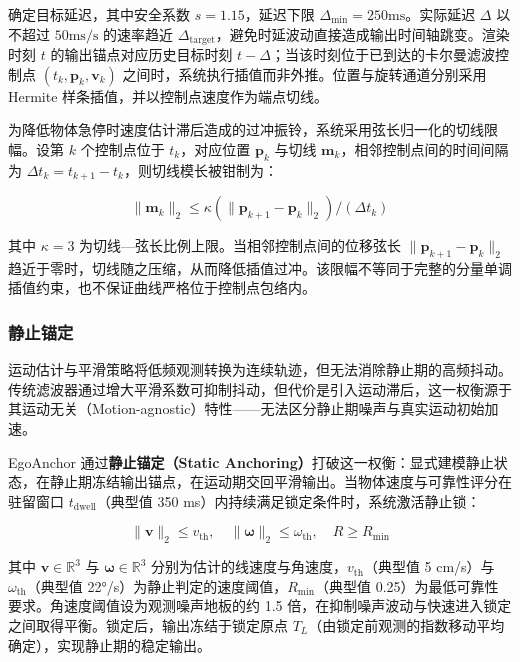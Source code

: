\documentclass[review]{vgtc}
\begin{document}
确定目标延迟，其中安全系数 $s = 1.15$，延迟下限 $\Delta_{\mathrm{min}} = 250 \mathrm{ms}$。实际延迟 $\Delta$ 以不超过 $50 \mathrm{ms}/\mathrm{s}$ 的速率趋近 $\Delta_{\mathrm{target}}$，避免时延波动直接造成输出时间轴跳变。渲染时刻 $t$ 的输出锚点对应历史目标时刻 $t - \Delta$；当该时刻位于已到达的卡尔曼滤波控制点 ${(t_k, \mathbf{p}_k, \mathbf{v}_k)}$ 之间时，系统执行插值而非外推。位置与旋转通道分别采用 Hermite 样条插值，并以控制点速度作为端点切线。

为降低物体急停时速度估计滞后造成的过冲振铃，系统采用弦长归一化的切线限幅。设第 $k$ 个控制点位于 $t_k$，对应位置 $\mathbf{p}_k$ 与切线 $\mathbf{m}_k$，相邻控制点间的时间间隔为 $\Delta t_k = t_{k+1} - t_k$，则切线模长被钳制为：

\begin{equation}
\lVert \mathbf{m}_k \rVert_2 \leq \kappa (\lVert \mathbf{p}_{k+1} - \mathbf{p}_k \rVert_2) / (\Delta t_k)
\label{eq:tangent-clamp}
\end{equation}


其中 $\kappa = 3$ 为切线---弦长比例上限。当相邻控制点间的位移弦长 $\lVert \mathbf{p}_{k+1} - \mathbf{p}_k \rVert_2$ 趋近于零时，切线随之压缩，从而降低插值过冲。该限幅不等同于完整的分量单调插值约束，也不保证曲线严格位于控制点包络内。

\subsubsection{静止锚定}\label{sec:staticlock}


运动估计与平滑策略将低频观测转换为连续轨迹，但无法消除静止期的高频抖动。传统滤波器通过增大平滑系数可抑制抖动，但代价是引入运动滞后，这一权衡源于其运动无关（Motion-agnostic）特性------无法区分静止期噪声与真实运动初始加速。

EgoAnchor 通过\textbf{静止锚定（Static Anchoring）}打破这一权衡：显式建模静止状态，在静止期冻结输出锚点，在运动期交回平滑输出。当物体速度与可靠性评分在驻留窗口 $t_{\mathrm{dwell}}$（典型值 350 ms）内持续满足锁定条件时，系统激活静止锁：

\begin{equation}
\lVert \mathbf{v} \rVert_2 \leq v_{\mathrm{th}}, \quad \lVert \mathbf{\omega} \rVert_2 \leq \omega_{\mathrm{th}}, \quad R \geq R_{\mathrm{min}}
\label{eq:lock-condition}
\end{equation}


其中 $\mathbf{v} \in \mathbb{R}^3$ 与 $\mathbf{\omega} \in \mathbb{R}^3$ 分别为估计的线速度与角速度，$v_{\mathrm{th}}$（典型值 5 cm/s）与 $\omega_{\mathrm{th}}$（典型值 22°/s）为静止判定的速度阈值，$R_{\mathrm{min}}$（典型值 0.25）为最低可靠性要求。角速度阈值设为观测噪声地板的约 1.5 倍，在抑制噪声波动与快速进入锁定之间取得平衡。锁定后，输出冻结于锁定原点 $T_L$（由锁定前观测的指数移动平均确定），实现静止期的稳定输出。
\end{document}
